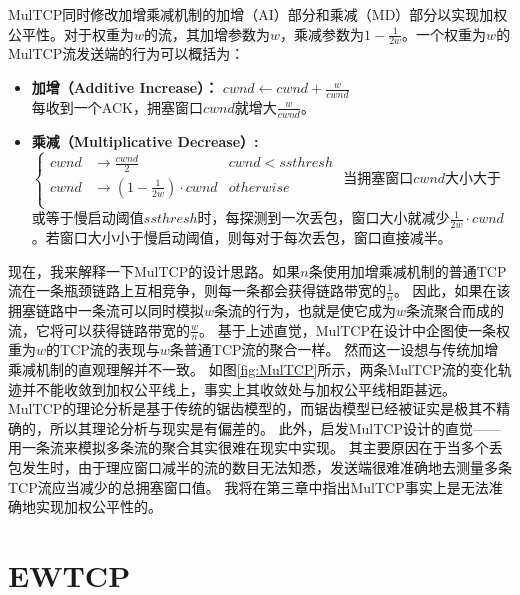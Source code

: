 \documentclass[winfonts]{njuthesis}
\begin{document}
MulTCP\cite{crowcroft1998differentiated}同时修改加增乘减机制的加增（AI）部分和乘减（MD）部分以实现加权公平性。对于权重为$w$的流，其加增参数为$w$，乘减参数为$1-\frac{1}{2w}$。一个权重为$w$的MulTCP流发送端的行为可以概括为：
\begin{itemize}
  \item {\bf 加增（Additive Increase）：} $cwnd \leftarrow cwnd + \frac{w}{cwnd}$ \\
  每收到一个ACK，拥塞窗口$cwnd$就增大$\frac{w}{cwnd}$。
  \item {\bf 乘减（Multiplicative Decrease）:}
  $ \left\{
  \begin{aligned}
  cwnd & \to \frac{cwnd}{2} & cwnd < ssthresh \\
  cwnd & \to \left( 1 - \frac{1}{2w} \right) \cdot cwnd & otherwise\\
  \end{aligned}
  \right.$ 
  当拥塞窗口$cwnd$大小大于或等于慢启动阈值$ssthresh$时，每探测到一次丢包，窗口大小就减少$\frac{1}{2w} \cdot cwnd$。若窗口大小小于慢启动阈值，则每对于每次丢包，窗口直接减半。
\end{itemize}
现在，我来解释一下MulTCP的设计思路。如果$n$条使用加增乘减机制的普通TCP流在一条瓶颈链路上互相竞争，则每一条都会获得链路带宽的$\frac{1}{n}$。
因此，如果在该拥塞链路中一条流可以同时模拟$w$条流的行为，也就是使它成为$w$条流聚合而成的流，它将可以获得链路带宽的$\frac{w}{n}$。
基于上述直觉，MulTCP在设计中企图使一条权重为$w$的TCP流的表现与$w$条普通TCP流的聚合一样。
然而这一设想与传统加增乘减机制的直观理解\cite{chiu1989analysis}并不一致。
如图\ref{fig:MulTCP}所示，两条MulTCP流的变化轨迹并不能收敛到加权公平线上，事实上其收敛处与加权公平线相距甚远。
MulTCP的理论分析是基于传统的锯齿模型的，而锯齿模型已经被证实是极其不精确的\cite{alizadeh2011analysis}，所以其理论分析与现实是有偏差的。
此外，启发MulTCP设计的直觉——用一条流来模拟多条流的聚合其实很难在现实中实现。
其主要原因在于当多个丢包发生时，由于理应窗口减半的流的数目无法知悉，发送端很难准确地去测量多条TCP流应当减少的总拥塞窗口值。
我将在第三章中指出MulTCP事实上是无法准确地实现加权公平性的。

\section{EWTCP}
\end{document}
